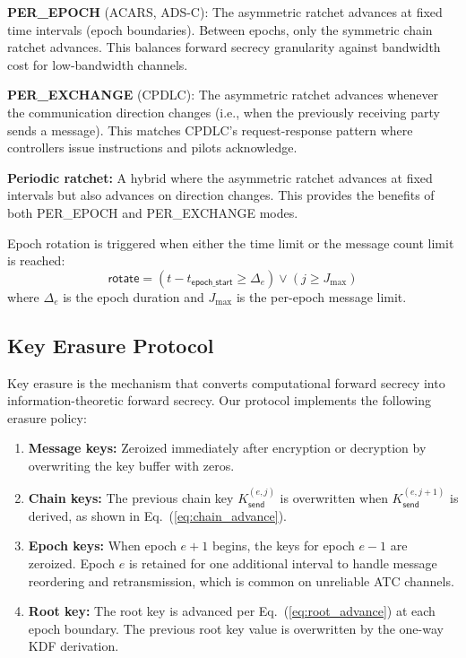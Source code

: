 \documentclass[conference,10pt]{IEEEtran}
\begin{document}
\textbf{PER\_EPOCH} (ACARS, ADS-C): The asymmetric ratchet advances at fixed time intervals (epoch boundaries). Between epochs, only the symmetric chain ratchet advances. This balances forward secrecy granularity against bandwidth cost for low-bandwidth channels.

\textbf{PER\_EXCHANGE} (CPDLC): The asymmetric ratchet advances whenever the communication direction changes (i.e., when the previously receiving party sends a message). This matches CPDLC's request-response pattern where controllers issue instructions and pilots acknowledge.

\textbf{Periodic ratchet:} A hybrid where the asymmetric ratchet advances at fixed intervals but also advances on direction changes. This provides the benefits of both PER\_EPOCH and PER\_EXCHANGE modes.

Epoch rotation is triggered when either the time limit or the message count limit is reached:
\begin{equation}
    \mathsf{rotate} = (t - t_{\mathsf{epoch\_start}} \geq \Delta_e) \vee (j \geq J_{\max})
\end{equation}
where $\Delta_e$ is the epoch duration and $J_{\max}$ is the per-epoch message limit.

\subsection{Key Erasure Protocol}

Key erasure is the mechanism that converts computational forward secrecy into information-theoretic forward secrecy. Our protocol implements the following erasure policy:

\begin{enumerate}
    \item \textbf{Message keys:} Zeroized immediately after encryption or decryption by overwriting the key buffer with zeros.

    \item \textbf{Chain keys:} The previous chain key $K_{\mathsf{send}}^{(e,j)}$ is overwritten when $K_{\mathsf{send}}^{(e,j+1)}$ is derived, as shown in Eq.~(\ref{eq:chain_advance}).

    \item \textbf{Epoch keys:} When epoch $e+1$ begins, the keys for epoch $e-1$ are zeroized. Epoch $e$ is retained for one additional interval to handle message reordering and retransmission, which is common on unreliable ATC channels.

    \item \textbf{Root key:} The root key is advanced per Eq.~(\ref{eq:root_advance}) at each epoch boundary. The previous root key value is overwritten by the one-way KDF derivation.
\end{enumerate}
\end{document}
